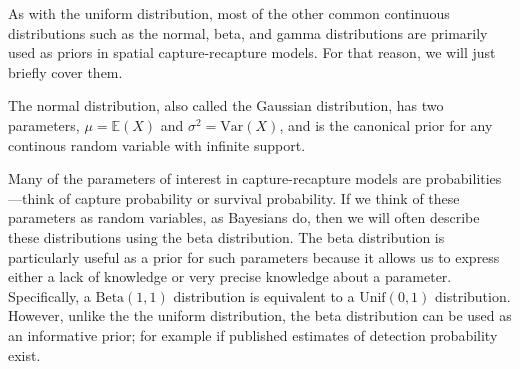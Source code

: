As with the uniform distribution, most of the other common continuous
distributions such as the normal, beta, and gamma distributions are
primarily used as priors in spatial capture-recapture models. For that
reason, we will just briefly cover them.

The normal distribution, also called the Gaussian distribution, has
two parameters, $\mu = \mathbb{E}(X)$ and $\sigma^2 = \text{Var}(X)$,
and is the canonical prior for any continous random variable with
infinite support.



Many of the parameters of interest in capture-recapture models are
probabilities---think of capture probability or survival
probability. If we think of these parameters as random variables,
as Bayesians do, then we will often describe these distributions using
the beta distribution. The beta distribution is particularly useful as
a prior for such parameters because it allows us to express either a
lack of knowledge or very precise knowledge about a
parameter. Specifically, a $\text{Beta}(1,1)$ distribution is
equivalent to a $\text{Unif}(0, 1)$ distribution. However, unlike the
the uniform distribution, the beta distribution can be used as an
informative prior; for example if published estimates of detection
probability exist.

